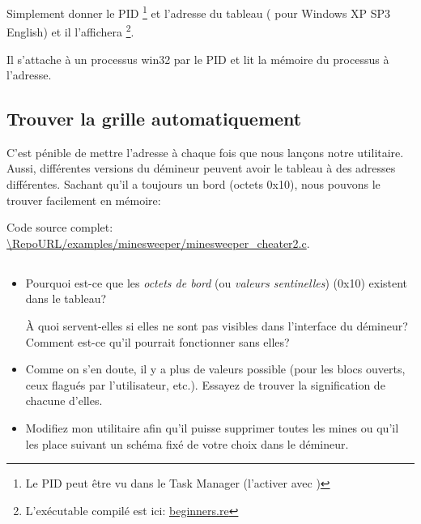 

Simplement donner le \ac{PID}
\footnote{Le PID peut être vu dans le Task Manager
(l'activer avec )}
et l'adresse du tableau ( pour Windows XP SP3 English)
et il l'affichera
\footnote{L'exécutable compilé est ici:
\href{http://beginners.re/examples/minesweeper_WinXP/minesweeper_cheater.exe}{beginners.re}}.

Il s'attache à un processus win32 par le \ac{PID} et lit la mémoire du processus
à l'adresse.

\subsection{Trouver la grille automatiquement}

C'est pénible de mettre l'adresse à chaque fois que nous lançons notre utilitaire.
Aussi, différentes versions du démineur peuvent avoir le tableau à des adresses différentes.
Sachant qu'il a toujours un bord (octets 0x10), nous pouvons le trouver facilement
en mémoire:



Code source complet: \url{\RepoURL/examples/minesweeper/minesweeper_cheater2.c}.

\subsection{\Exercises}

\begin{itemize}

\item 
Pourquoi est-ce que les \emph{octets de bord} (ou \emph{valeurs sentinelles}) (0x10)
existent dans le tableau?

À quoi servent-elles si elles ne sont pas visibles dans l'interface du démineur?
Comment est-ce qu'il pourrait fonctionner sans elles?

\item 
Comme on s'en doute, il y a plus de valeurs possible (pour les blocs ouverts, ceux
flagués par l'utilisateur, etc.).
Essayez de trouver la signification de chacune d'elles.

\item 
Modifiez mon utilitaire afin qu'il puisse supprimer toutes les mines ou qu'il les
place suivant un schéma fixé de votre choix dans le démineur.

\end{itemize}
